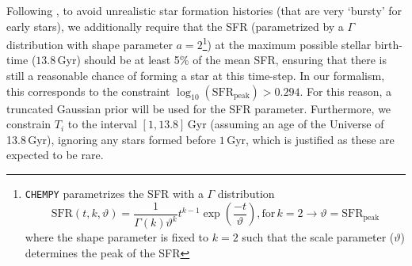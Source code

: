 \documentclass{aa}
\begin{document}
Following \citet{Philcox_2019}, to avoid unrealistic star formation histories (that are very `bursty' for early stars), we additionally require that the SFR (parametrized by a $\Gamma$ distribution with shape parameter $a=2$\footnote{\texttt{CHEMPY} parametrizes the SFR with a $\Gamma$ distribution
\begin{equation*}
\label{eq:SFR}
\mathrm{SFR}\left(t,k,\vartheta\right)=\frac{1}{\Gamma(k)\vartheta^k}t^{k-1}\exp\left(\frac{-t}{\vartheta}\right), \mathrm{for}\,k=2 \rightarrow \vartheta = \mathrm{SFR}_\mathrm{peak} 
\end{equation*}
where the shape parameter is fixed to $k=2$ such that the scale parameter ($\vartheta$) determines the peak of the SFR}) at the maximum possible stellar birth-time ($13.8$\,Gyr) should be at least 5\% of the mean SFR, ensuring that there is still a reasonable chance of forming a star at this time-step. In our formalism, this corresponds to the constraint $\log_{10}\left(\mathrm{SFR}_\mathrm{peak}\right)>0.294$. For this reason, a truncated Gaussian prior will be used for the SFR parameter. Furthermore, we constrain $T_i$ to the interval $[1,13.8]$\,Gyr (assuming an age of the Universe of 13.8\,Gyr), ignoring any stars formed before $1$\,Gyr, which is justified as these are expected to be rare.
\end{document}

